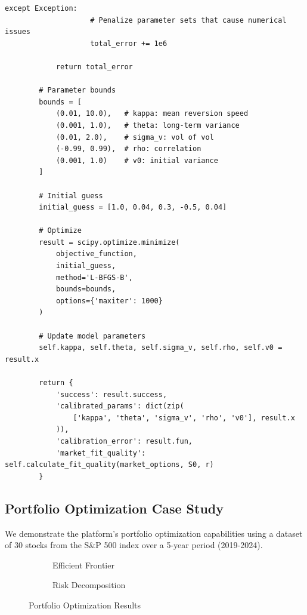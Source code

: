 \documentclass[12pt,a4paper]{article}
\theoremstyle{definition}
\theoremstyle{remark}
\begin{document}
\begin{lstlisting}[caption=Heston Model Implementation]
                except Exception:
                    # Penalize parameter sets that cause numerical issues
                    total_error += 1e6
            
            return total_error
        
        # Parameter bounds
        bounds = [
            (0.01, 10.0),   # kappa: mean reversion speed
            (0.001, 1.0),   # theta: long-term variance
            (0.01, 2.0),    # sigma_v: vol of vol
            (-0.99, 0.99),  # rho: correlation
            (0.001, 1.0)    # v0: initial variance
        ]
        
        # Initial guess
        initial_guess = [1.0, 0.04, 0.3, -0.5, 0.04]
        
        # Optimize
        result = scipy.optimize.minimize(
            objective_function,
            initial_guess,
            method='L-BFGS-B',
            bounds=bounds,
            options={'maxiter': 1000}
        )
        
        # Update model parameters
        self.kappa, self.theta, self.sigma_v, self.rho, self.v0 = result.x
        
        return {
            'success': result.success,
            'calibrated_params': dict(zip(
                ['kappa', 'theta', 'sigma_v', 'rho', 'v0'], result.x
            )),
            'calibration_error': result.fun,
            'market_fit_quality': self.calculate_fit_quality(market_options, S0, r)
        }
\end{lstlisting}

\subsection{Portfolio Optimization Case Study}

We demonstrate the platform's portfolio optimization capabilities using a dataset of 30 stocks from the S\&P 500 index over a 5-year period (2019-2024).

\begin{figure}[htbp]
\centering
\begin{subfigure}{0.45\textwidth}
    \centering
    \caption{Efficient Frontier}
\end{subfigure}
\hfill
\begin{subfigure}{0.45\textwidth}
    \centering
    \caption{Risk Decomposition}
\end{subfigure}
\caption{Portfolio Optimization Results}
\end{figure}
\end{document}
